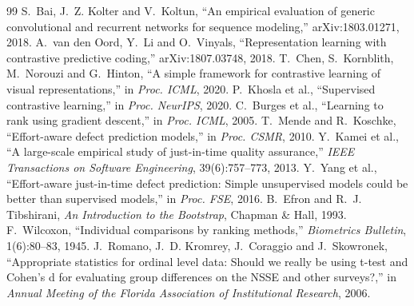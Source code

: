 \documentclass[11pt,a4paper,openany]{report}
\begin{document}
\begin{thebibliography}{99}
 S.~Bai, J.~Z. Kolter and V.~Koltun, ``An empirical evaluation of generic convolutional and
  recurrent networks for sequence modeling,'' arXiv:1803.01271, 2018.
 A.~van den Oord, Y.~Li and O.~Vinyals, ``Representation learning with contrastive predictive
  coding,'' arXiv:1807.03748, 2018.
 T.~Chen, S.~Kornblith, M.~Norouzi and G.~Hinton, ``A simple framework for contrastive learning of
  visual representations,'' in \emph{Proc. ICML}, 2020.
 P.~Khosla et al., ``Supervised contrastive learning,'' in \emph{Proc. NeurIPS}, 2020.
 C.~Burges et al., ``Learning to rank using gradient descent,'' in \emph{Proc. ICML}, 2005.
 T.~Mende and R.~Koschke, ``Effort-aware defect prediction models,'' in \emph{Proc. CSMR}, 2010.
 Y.~Kamei et al., ``A large-scale empirical study of just-in-time quality assurance,''
  \emph{IEEE Transactions on Software Engineering}, 39(6):757--773, 2013.
 Y.~Yang et al., ``Effort-aware just-in-time defect prediction: Simple unsupervised models could be
  better than supervised models,'' in \emph{Proc. FSE}, 2016.
 B.~Efron and R.~J. Tibshirani, \emph{An Introduction to the Bootstrap}, Chapman \& Hall, 1993.
 F.~Wilcoxon, ``Individual comparisons by ranking methods,'' \emph{Biometrics Bulletin},
  1(6):80--83, 1945.
 J.~Romano, J.~D. Kromrey, J.~Coraggio and J.~Skowronek, ``Appropriate statistics for ordinal
  level data: Should we really be using t-test and Cohen's d for evaluating group differences on the NSSE and other
  surveys?,'' in \emph{Annual Meeting of the Florida Association of Institutional Research}, 2006.
\end{thebibliography}
\end{document}
